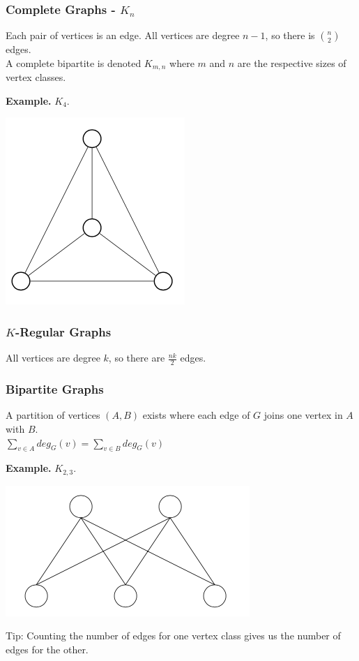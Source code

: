 \documentclass[11pt]{article}
\newenvironment{eg}[1]{
\begin{tcolorbox}[colback = white!15, arc=0pt,outer arc=0pt, colframe = black]
{\color{black} \textbf{Example.} #1} \\[5pt]
}
{
\end{tcolorbox}
}
\newcommand{\nl}{\\[5pt]}
\begin{document}
\subsubsection{Complete Graphs - $K_n$}
Each pair of vertices is an edge. All vertices are degree $n-1$, so there is $\binom{n}{2}$ edges. \nl  A complete bipartite is denoted $K_{m, n}$ where $m$ and $n$ are the respective sizes of vertex classes. 
\begin{eg}{$K_4$.}
\vspace{-30pt}
\begin{center}
    \includegraphics[scale=0.5]{Figures/K4.png}
\end{center}
\end{eg}

\subsubsection{$K$-Regular Graphs}
All vertices are degree $k$, so there are $\frac{nk}{2}$ edges.
\subsubsection{Bipartite Graphs}
A partition of vertices $(A,B)$ exists where each edge of $G$ joins one vertex in $A$ with $B$. \nl
$\sum_{v\in A}deg_G(v) = \sum_{v\in B}deg_G(v)$
\begin{eg}{$K_{2,3}.$}
\vspace{-30pt}
\begin{center}
    \includegraphics[scale=0.5]{Figures/Bipartite.png}
\end{center}
\end{eg}
Tip: Counting the number of edges for one vertex class gives us the number of edges for the other. 
\end{document}

